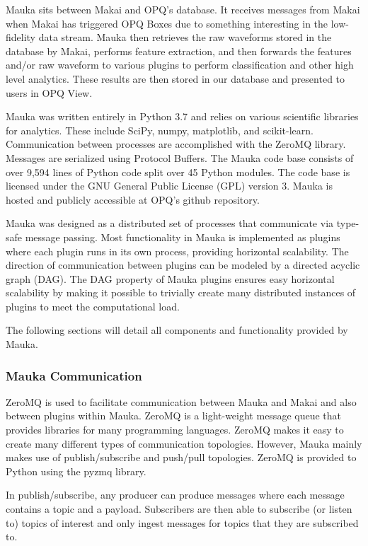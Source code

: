 Mauka sits between Makai and OPQ's database. It receives messages from Makai when Makai has triggered OPQ Boxes due to something interesting in the low-fidelity data stream. Mauka then retrieves the raw waveforms stored in the database by Makai, performs feature extraction, and then forwards the features and/or raw waveform to various plugins to perform classification and other high level analytics. These results are then stored in our database and presented to users in OPQ View.

Mauka was written entirely in Python 3.7\cite{python:2019} and relies on various scientific libraries for analytics. These include SciPy\cite{scipy:2019}, numpy\cite{numpy}, matplotlib\cite{matplotlib}, and scikit-learn\cite{scikitlearn}. Communication between processes are accomplished with the ZeroMQ\cite{zmq} library. Messages are serialized using Protocol Buffers\cite{protobuf}. The Mauka code base consists of over 9,594 lines of Python code split over 45 Python modules. The code base is licensed under the GNU General Public License (GPL) version 3\cite{gplv3}. Mauka is hosted and publicly accessible at OPQ's github repository\cite{opqgithub}.

Mauka was designed as a distributed set of processes that communicate via type-safe message passing. Most functionality in Mauka is implemented as plugins where each plugin runs in its own process, providing horizontal scalability. The direction of communication between plugins can be modeled by a directed acyclic graph (DAG). The DAG property of Mauka plugins ensures easy horizontal scalability by making it possible to trivially create many distributed instances of plugins to meet the computational load.

The following sections will detail all components and functionality provided by Mauka.

\subsubsection{Mauka Communication}
ZeroMQ is used to facilitate communication between Mauka and Makai and also between plugins within Mauka. ZeroMQ is a light-weight message queue that provides libraries for many programming languages. ZeroMQ makes it easy to create many different types of communication topologies. However, Mauka mainly makes use of publish/subscribe and push/pull topologies. ZeroMQ is provided to Python using the pyzmq library.

In publish/subscribe, any producer can produce messages where each message contains a topic and a payload. Subscribers are then able to subscribe (or listen to) topics of interest and only ingest messages for topics that they are subscribed to.

